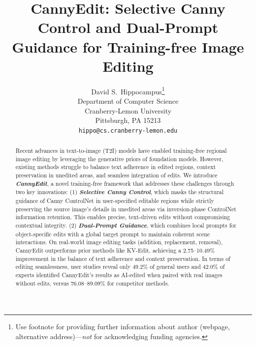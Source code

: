 \documentclass{article}
\title{CannyEdit: Selective Canny Control and Dual-Prompt Guidance for Training-free Image Editing}
\author{%
  David S.~Hippocampus\thanks{Use footnote for providing further information
    about author (webpage, alternative address)---\emph{not} for acknowledging
    funding agencies.} \\
  Department of Computer Science\\
  Cranberry-Lemon University\\
  Pittsburgh, PA 15213 \\
  \texttt{hippo@cs.cranberry-lemon.edu} \\
}
\begin{document}
\maketitle


\begin{abstract}
Recent advances in text-to-image (T2I) models have enabled training-free regional image editing by leveraging the generative priors of foundation models. However, existing methods struggle to balance text adherence in edited regions, context preservation in unedited areas, and seamless integration of edits. We introduce \textbf{\textit{CannyEdit}}, a novel training-free framework that addresses these challenges through two key innovations: (1) \textbf{\textit{Selective Canny Control}}, which masks the structural guidance of Canny ControlNet in user-specified editable regions while strictly preserving the source image’s details in unedited areas via inversion-phase ControlNet information retention. This enables precise, text-driven edits without compromising contextual integrity. (2) \textbf{\textit{Dual-Prompt Guidance}}, which combines local prompts for object-specific edits with a global target prompt to maintain coherent scene interactions. On real-world image editing tasks (addition, replacement, removal), CannyEdit outperforms prior methods like KV-Edit, achieving a 2.75–10.49\% improvement in the balance of text adherence and context preservation. In terms of editing seamlessness, user studies reveal only 49.2\% of general users and 42.0\% of experts identified CannyEdit's results as AI-edited when paired with real images without edits, versus 76.08–89.09\% for competitor methods.
\end{abstract}

\end{document}
